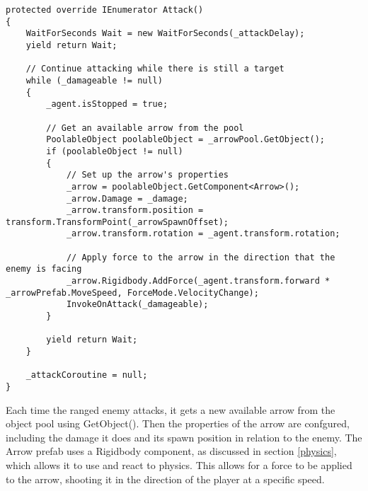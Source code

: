 \documentclass[]{final_report}
\begin{document}
\begin{verbatim}
protected override IEnumerator Attack()
{
    WaitForSeconds Wait = new WaitForSeconds(_attackDelay);
    yield return Wait;

    // Continue attacking while there is still a target
    while (_damageable != null)
    {
        _agent.isStopped = true;

        // Get an available arrow from the pool
        PoolableObject poolableObject = _arrowPool.GetObject();
        if (poolableObject != null)
        {
            // Set up the arrow's properties
            _arrow = poolableObject.GetComponent<Arrow>();
            _arrow.Damage = _damage;
            _arrow.transform.position = transform.TransformPoint(_arrowSpawnOffset);
            _arrow.transform.rotation = _agent.transform.rotation;

            // Apply force to the arrow in the direction that the enemy is facing
            _arrow.Rigidbody.AddForce(_agent.transform.forward * _arrowPrefab.MoveSpeed, ForceMode.VelocityChange);
            InvokeOnAttack(_damageable);
        }
            
        yield return Wait;
    }

    _attackCoroutine = null;
}
\end{verbatim}
Each time the ranged enemy attacks, it gets a new available arrow from the object pool using GetObject(). Then the properties of the arrow are confgured, including the damage it does and its spawn position in relation to the enemy. The Arrow prefab uses a Rigidbody component, as discussed in section \ref{physics}, which allows it to use and react to physics. This allows for a force to be applied to the arrow, shooting it in the direction of the player at a specific speed. 
\color{black}




\end{document}
